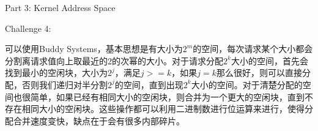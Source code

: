 \documentclass[GBK,winfonts,a4paper,10pt]{ctexart}
\begin{document}
\begin{section}{Part 3: Kernel Address Space}
\begin{subsection}{Challenge 4:}
\par
可以使用Buddy Systems，基本思想是有大小为$2^m$的空间，每次请求某个大小都会分割离请求值向上取最近的2的次幂的大小。对于请求分配$2^k$大小的空间，首先会找到最小的空闲块，大小为$2^j$，满足$j>=k$，如果$j=k$那么很好，则可以直接分配，否则我们递归对半分割$2^j$的空间，直到出现$2^k$大小的空间。对于清楚分配的空间也很简单，如果已经有相同大小的空闲块，则合并为一个更大的空闲块，直到不存在相同大小的空闲块。这些操作都可以利用二进制数进行位运算来进行，使得分配合并速度变快，缺点在于会有很多内部碎片。
\end{subsection}

\end{section}
\end{document}
